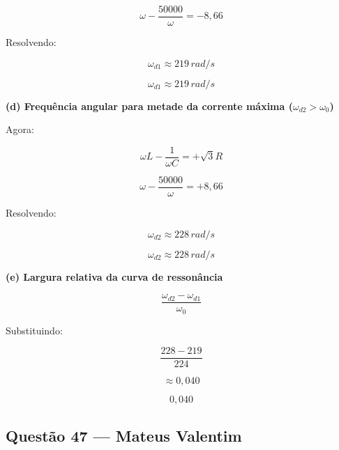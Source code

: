 \documentclass[12pt,a4paper]{article}
\begin{document}
\[
\omega - \frac{50000}{\omega} = -8,66
\]

Resolvendo:

\[
\omega_{d1} \approx 219\,rad/s
\]

\[
\boxed{\omega_{d1} \approx 219\,rad/s}
\]

\textbf{(d) Frequência angular para metade da corrente máxima (\(\omega_{d2} > \omega_0\))}

Agora:

\[
\omega L - \frac{1}{\omega C} = +\sqrt{3}R
\]

\[
\omega - \frac{50000}{\omega} = +8,66
\]

Resolvendo:

\[
\omega_{d2} \approx 228\,rad/s
\]

\[
\boxed{\omega_{d2} \approx 228\,rad/s}
\]

\textbf{(e) Largura relativa da curva de ressonância}

\[
\frac{\omega_{d2} - \omega_{d1}}{\omega_0}
\]

Substituindo:

\[
\frac{228 - 219}{224}
\]

\[
\approx 0,040
\]

\[
\boxed{0,040}
\]
\subsection{Questão 47 — Mateus Valentim}
\end{document}
